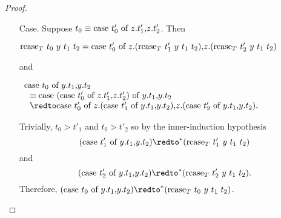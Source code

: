 \begin{proof}
\begin{itemize}
\begin{itemize}
    \item[Case.] Suppose $t_0 \equiv \mbox{case}\ t'_0\ \text{of}\ z\text{.}t'_1\text{,}z\text{.}t'_2$.  Then 
      \begin{center}
        \begin{math}
          \mbox{rcase}_{T}\ t_0\ y\ t_1\ t_2 = 
          \mbox{case}\ t'_0\ \text{of}\ z\text{.}(\mbox{rcase}_{T}\ t'_1\ y\ t_1\ t_2)\text{,}z\text{.}(\mbox{rcase}_{T}\ t'_2\ y\ t_1\ t_2)
        \end{math}
      \end{center}
      and
      \begin{center}
        \begin{math}
          \begin{array}{lll}
            \ccon{t_0}{y}{t_1}{t_2} \\
            \,\,\,\,\equiv  \ccon{(\ccon{t'_0}{z}{t'_1}{t'_2})}{y}{t_1}{t_2}\\
            \,\,\,\,\redto \ccon{t'_0}{z}{(\ccon{t'_1}{y}{t_1}{t_2})}{(\ccon{t'_2}{y}{t_1}{t_2})}.
          \end{array}
        \end{math}
      \end{center}
      Trivially, $t_0 > t'_1$ and $t_0 > t'_2$ so by the inner-induction hypothesis \\
      \[ (\ccon{t'_1}{y}{t_1}{t_2}) \redto^* (\rcase{T}{t'_1}{y}{t_1}{t_2})\] and 
      \[(\ccon{t'_2}{y}{t_1}{t_2}) \redto^* (\rcase{T}{t'_2}{y}{t_1}{t_2}).\]  Therefore,
      $(\ccon{t_0}{y}{t_1}{t_2}) \redto^* (\rcase{T}{t_0}{y}{t_1}{t_2})$.
    \end{itemize}
    

\end{itemize}
\end{proof}
